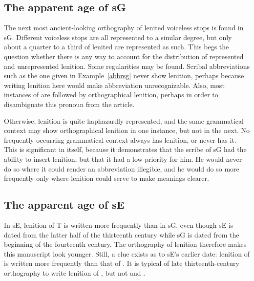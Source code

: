 \subsection{The apparent age of \gls{sG}}
\label{sec:apparent-age-glssg}

The next most ancient-looking orthography of lenited voiceless stops is found in \gls{sG}. Different voiceless stops are all represented to a similar degree, but only about a quarter to a third of lenited  are represented as such. This begs the question whether there is any way to account for the distribution of represented and unrepresented lenition. Some regularities may be found. Scribal abbreviations such as the one given in Example~\ref{abbrsg} never show lenition, perhaps because writing lenition here would make abbreviation unrecognizable.
Also, most instances of  are followed by orthographical lenition, perhaps in order to disambiguate this pronoun from the article.

Otherwise, lenition is quite haphazardly represented, and the same grammatical context may show orthographical lenition in one instance, but not in the next. No frequently-occurring grammatical context always has lenition, or never has it. This is significant in itself, because it demonstrates that the scribe of \gls{sG} had the ability to insert lenition, but that it had a low priority for him. He would never do so where it could render an abbreviation illegible, and he would do so more frequently only where lenition could serve to make meanings clearer.

\subsection{The apparent age of \gls{sE}}
\label{sec:apparent-age-glsse}

In \gls{sE}, lenition of \gls{T} is written more frequently than in \gls{sG}, even though \gls{sE} is dated from the latter half of the thirteenth century while \gls{sG} is dated from the beginning of the fourteenth century. The orthography of lenition therefore makes this manuscript look younger. Still, a clue exists as to \gls{sE}'s earlier date: lenition of  is written  more frequently than that of . It is typical of late thirteenth-century orthography to write lenition of , but not  and . 

